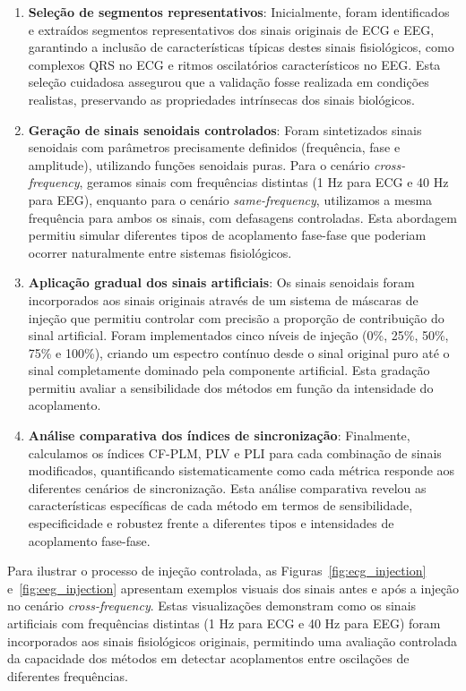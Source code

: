 \begin{enumerate}
    \item \textbf{Seleção de segmentos representativos}: Inicialmente, foram identificados e extraídos segmentos representativos dos sinais originais de ECG e EEG, garantindo a inclusão de características típicas destes sinais fisiológicos, como complexos QRS no ECG e ritmos oscilatórios característicos no EEG. Esta seleção cuidadosa assegurou que a validação fosse realizada em condições realistas, preservando as propriedades intrínsecas dos sinais biológicos.

    \item \textbf{Geração de sinais senoidais controlados}: Foram sintetizados sinais senoidais com parâmetros precisamente definidos (frequência, fase e amplitude), utilizando funções senoidais puras. Para o cenário \textit{cross-frequency}, geramos sinais com frequências distintas (1 Hz para ECG e 40 Hz para EEG), enquanto para o cenário \textit{same-frequency}, utilizamos a mesma frequência para ambos os sinais, com defasagens controladas. Esta abordagem permitiu simular diferentes tipos de acoplamento fase-fase que poderiam ocorrer naturalmente entre sistemas fisiológicos.

    \item \textbf{Aplicação gradual dos sinais artificiais}: Os sinais senoidais foram incorporados aos sinais originais através de um sistema de máscaras de injeção que permitiu controlar com precisão a proporção de contribuição do sinal artificial. Foram implementados cinco níveis de injeção (0\%, 25\%, 50\%, 75\% e 100\%), criando um espectro contínuo desde o sinal original puro até o sinal completamente dominado pela componente artificial. Esta gradação permitiu avaliar a sensibilidade dos métodos em função da intensidade do acoplamento.

    \item \textbf{Análise comparativa dos índices de sincronização}: Finalmente, calculamos os índices CF-PLM, PLV e PLI para cada combinação de sinais modificados, quantificando sistematicamente como cada métrica responde aos diferentes cenários de sincronização. Esta análise comparativa revelou as características específicas de cada método em termos de sensibilidade, especificidade e robustez frente a diferentes tipos e intensidades de acoplamento fase-fase.
\end{enumerate}

Para ilustrar o processo de injeção controlada, as Figuras~\ref{fig:ecg_injection} e~\ref{fig:eeg_injection} apresentam exemplos visuais dos sinais antes e após a injeção no cenário \textit{cross-frequency}. Estas visualizações demonstram como os sinais artificiais com frequências distintas (1 Hz para ECG e 40 Hz para EEG) foram incorporados aos sinais fisiológicos originais, permitindo uma avaliação controlada da capacidade dos métodos em detectar acoplamentos entre oscilações de diferentes frequências.

